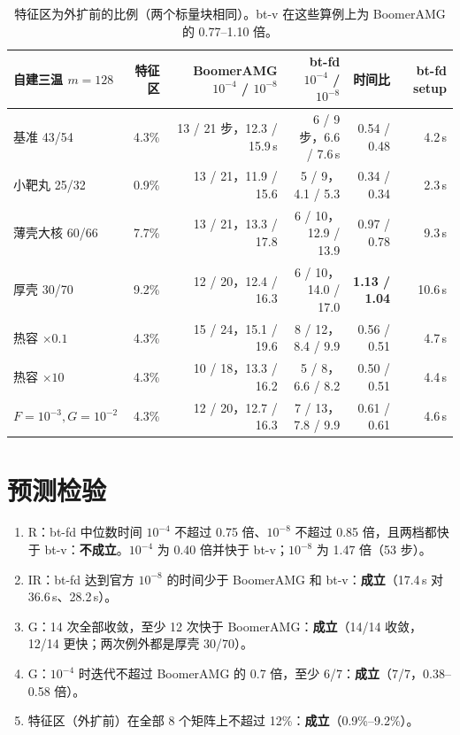 \documentclass[11pt,a4paper]{ctexart}
\begin{document}
\begin{table}[H]
\centering\footnotesize\setlength{\tabcolsep}{4pt}
\begin{tabular}{lrrrrr}
\toprule
自建三温 $m=128$ & 特征区 & BoomerAMG $10^{-4}$ / $10^{-8}$ & bt-fd $10^{-4}$ / $10^{-8}$ & 时间比 & bt-fd setup \\
\midrule
基准 43/54 & 4.3\% & 13 / 21 步，12.3 / 15.9\,s & 6 / 9 步，6.6 / 7.6\,s & 0.54 / 0.48 & 4.2\,s \\
小靶丸 25/32 & 0.9\% & 13 / 21，11.9 / 15.6 & 5 / 9，4.1 / 5.3 & 0.34 / 0.34 & 2.3\,s \\
薄壳大核 60/66 & 7.7\% & 13 / 21，13.3 / 17.8 & 6 / 10，12.9 / 13.9 & 0.97 / 0.78 & 9.3\,s \\
厚壳 30/70 & 9.2\% & 12 / 20，12.4 / 16.3 & 6 / 10，14.0 / 17.0 & \textbf{1.13 / 1.04} & 10.6\,s \\
热容 $\times0.1$ & 4.3\% & 15 / 24，15.1 / 19.6 & 8 / 12，8.4 / 9.9 & 0.56 / 0.51 & 4.7\,s \\
热容 $\times10$ & 4.3\% & 10 / 18，13.3 / 16.2 & 5 / 8，6.6 / 8.2 & 0.50 / 0.51 & 4.4\,s \\
$F=10^{-3},G=10^{-2}$ & 4.3\% & 12 / 20，12.7 / 16.3 & 7 / 13，7.8 / 9.9 & 0.61 / 0.61 & 4.6\,s \\
\bottomrule
\end{tabular}
\caption{特征区为外扩前的比例（两个标量块相同）。bt-v 在这些算例上为 BoomerAMG 的 0.77--1.10 倍。}
\end{table}

\section{预测检验}
\begin{enumerate}
\item R：bt-fd 中位数时间 $10^{-4}$ 不超过 0.75 倍、$10^{-8}$ 不超过 0.85 倍，且两档都快于 bt-v：\textbf{不成立}。$10^{-4}$ 为 0.40 倍并快于 bt-v；$10^{-8}$ 为 1.47 倍（53 步）。
\item IR：bt-fd 达到官方 $10^{-8}$ 的时间少于 BoomerAMG 和 bt-v：\textbf{成立}（17.4\,s 对 36.6\,s、28.2\,s）。
\item G：14 次全部收敛，至少 12 次快于 BoomerAMG：\textbf{成立}（14/14 收敛，12/14 更快；两次例外都是厚壳 30/70）。
\item G：$10^{-4}$ 时迭代不超过 BoomerAMG 的 0.7 倍，至少 6/7：\textbf{成立}（7/7，0.38--0.58 倍）。
\item 特征区（外扩前）在全部 8 个矩阵上不超过 12\%：\textbf{成立}（0.9\%--9.2\%）。
\end{enumerate}
\end{document}
